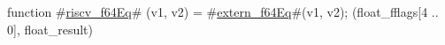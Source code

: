 function #\hyperref[sailRISCVzriscvzyf64Eq]{riscv\_f64Eq}# (v1, v2) = {
  #\hyperref[sailRISCVzexternzyf64Eq]{extern\_f64Eq}#(v1, v2);
  (float_fflags[4 .. 0], float_result)
}
